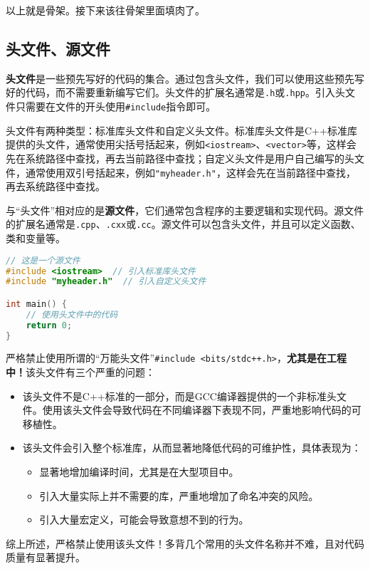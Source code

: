 以上就是骨架。接下来该往骨架里面填肉了。

\subsection{头文件、源文件}

\textbf{头文件}是一些预先写好的代码的集合。通过包含头文件，我们可以使用这些预先写好的代码，而不需要重新编写它们。头文件的扩展名通常是\texttt{.h}或\texttt{.hpp}。引入头文件只需要在文件的开头使用\texttt{\#include}指令即可。

头文件有两种类型：标准库头文件和自定义头文件。标准库头文件是C++标准库提供的头文件，通常使用尖括号括起来，例如\texttt{<iostream>}、\texttt{<vector>}等，这样会先在系统路径中查找，再去当前路径中查找；自定义头文件是用户自己编写的头文件，通常使用双引号括起来，例如\texttt{"myheader.h"}，这样会先在当前路径中查找，再去系统路径中查找。

与“头文件”相对应的是\textbf{源文件}，它们通常包含程序的主要逻辑和实现代码。源文件的扩展名通常是\texttt{.cpp}、\texttt{.cxx}或\texttt{.cc}。源文件可以包含头文件，并且可以定义函数、类和变量等。

\begin{lstlisting}[language=C++]
// 这是一个源文件
#include <iostream>  // 引入标准库头文件
#include "myheader.h"  // 引入自定义头文件

int main() {
    // 使用头文件中的代码
    return 0;
}
\end{lstlisting}

\begin{warning}
    严格禁止使用所谓的“万能头文件”\texttt{\#include <bits/stdc++.h>}，\textbf{尤其是在工程中！}该头文件有三个严重的问题：
    \begin{itemize}
        \item 该头文件不是C++标准的一部分，而是GCC编译器提供的一个非标准头文件。使用该头文件会导致代码在不同编译器下表现不同，严重地影响代码的可移植性。
        \item 该头文件会引入整个标准库，从而显著地降低代码的可维护性，具体表现为：
        \begin{itemize}
            \item 显著地增加编译时间，尤其是在大型项目中。
            \item 引入大量实际上并不需要的库，严重地增加了命名冲突的风险。
            \item 引入大量宏定义，可能会导致意想不到的行为。
        \end{itemize}
    \end{itemize}
    综上所述，严格禁止使用该头文件！多背几个常用的头文件名称并不难，且对代码质量有显著提升。
\end{warning}

